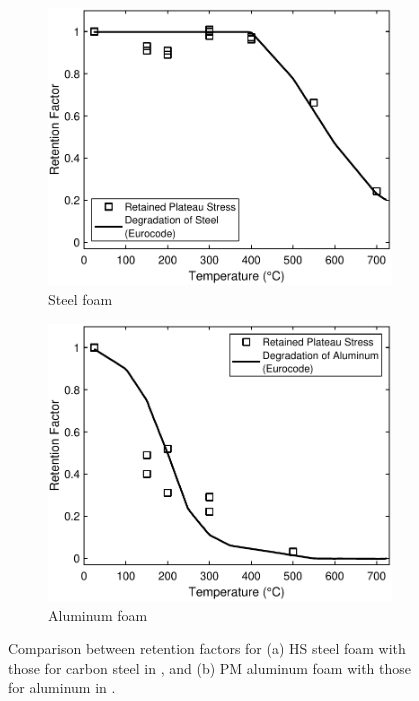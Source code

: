 \documentclass[review]{elsarticle}
\begin{document}
\begin{figure}
	\centering
	\begin{subfigure}{0.50\textwidth}
		\centering
		\includegraphics[width=0.90\linewidth]
		{Tex-Figures/Fig23a_Retained_Plateu_Stress_Steel.pdf}
		\caption{Steel foam}
		\label{fig:retention_Steel}
	\end{subfigure}%
	\begin{subfigure}{0.50\textwidth}
		\centering
		\includegraphics[width=0.90\linewidth]
		{Tex-Figures/Fig23b_Retained_Plateu_Stress_Aluminum.pdf}
		\caption{Aluminum foam}
		\label{retention_Al}
	\end{subfigure}
	\caption{Comparison between retention factors for (a) HS steel foam with those for carbon steel in \cite{EC3-1-2}, and (b) PM aluminum foam with those for aluminum in \cite{EC3-1-2}.}
	\label{fig:retention}
\end{figure}
\end{document}

